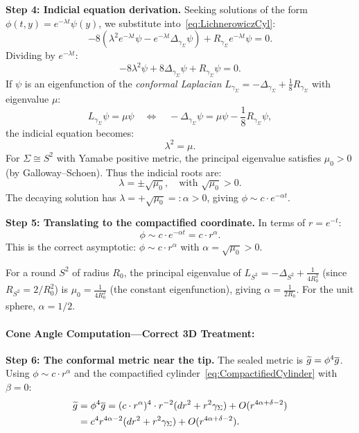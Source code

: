 \begin{lemma}
\textbf{Step 4: Indicial equation derivation.}
Seeking solutions of the form $\phi(t, y) = e^{-\lambda t} \psi(y)$, we substitute into~\eqref{eq:LichnerowiczCyl}:
\begin{equation}
    -8\left(\lambda^2 e^{-\lambda t}\psi - e^{-\lambda t}\Delta_{\gamma_\Sigma}\psi\right) + R_{\gamma_\Sigma} e^{-\lambda t}\psi = 0.
\end{equation}
Dividing by $e^{-\lambda t}$:
\begin{equation}
    -8\lambda^2 \psi + 8\Delta_{\gamma_\Sigma}\psi + R_{\gamma_\Sigma}\psi = 0.
\end{equation}
If $\psi$ is an eigenfunction of the \emph{conformal Laplacian} $L_{\gamma_\Sigma} = -\Delta_{\gamma_\Sigma} + \frac{1}{8}R_{\gamma_\Sigma}$ with eigenvalue $\mu$:
\begin{equation}
    L_{\gamma_\Sigma}\psi = \mu\psi \quad \Leftrightarrow \quad -\Delta_{\gamma_\Sigma}\psi = \mu\psi - \frac{1}{8}R_{\gamma_\Sigma}\psi,
\end{equation}
the indicial equation becomes:
\begin{equation}\label{eq:IndicialEquation}
    \lambda^2 = \mu.
\end{equation}
For $\Sigma \cong S^2$ with Yamabe positive metric, the principal eigenvalue satisfies $\mu_0 > 0$ (by Galloway--Schoen). Thus the indicial roots are:
\begin{equation}
    \lambda = \pm\sqrt{\mu_0}, \quad \text{with } \sqrt{\mu_0} > 0.
\end{equation}
The decaying solution has $\lambda = +\sqrt{\mu_0} =: \alpha > 0$, giving $\phi \sim c \cdot e^{-\alpha t}$.

\textbf{Step 5: Translating to the compactified coordinate.}
In terms of $r = e^{-t}$:
\begin{equation}
    \phi \sim c \cdot e^{-\alpha t} = c \cdot r^\alpha.
\end{equation}
This is the correct asymptotic: $\phi \sim c \cdot r^\alpha$ with $\alpha = \sqrt{\mu_0} > 0$.

For a round $S^2$ of radius $R_0$, the principal eigenvalue of $L_{S^2} = -\Delta_{S^2} + \frac{1}{4R_0^2}$ (since $R_{S^2} = 2/R_0^2$) is $\mu_0 = \frac{1}{4R_0^2}$ (the constant eigenfunction), giving $\alpha = \frac{1}{2R_0}$. For the unit sphere, $\alpha = 1/2$.

\paragraph{Cone Angle Computation---Correct 3D Treatment:}
\textbf{Step 6: The conformal metric near the tip.}
The sealed metric is $\widetilde{g} = \phi^4 \overline{g}$. Using $\phi \sim c \cdot r^\alpha$ and the compactified cylinder~\eqref{eq:CompactifiedCylinder} with $\beta = 0$:
\begin{align}
    \widetilde{g} &= \phi^4 \overline{g} = (c \cdot r^\alpha)^4 \cdot r^{-2}(dr^2 + r^2 \gamma_\Sigma) + O(r^{4\alpha + \delta - 2}) \notag\\
    &= c^4 r^{4\alpha - 2}(dr^2 + r^2 \gamma_\Sigma) + O(r^{4\alpha + \delta - 2}).
\end{align}


\end{lemma}
